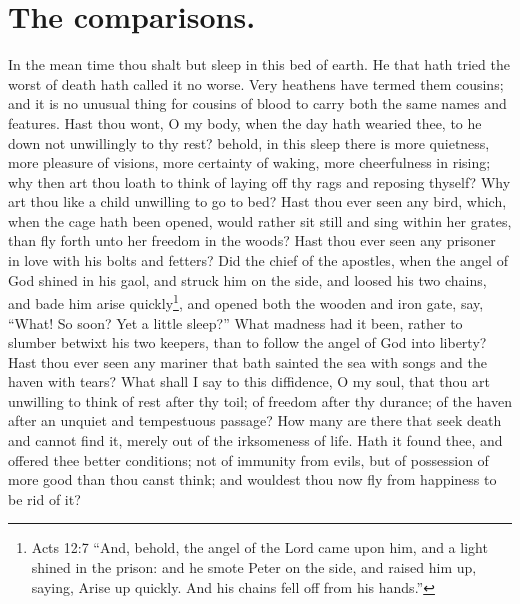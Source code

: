 \section{The comparisons.}
In the mean time thou shalt but sleep in this bed of earth. He that hath tried the worst of death hath called it no worse. Very heathens have termed them cousins; and it is no unusual thing for cousins of blood to carry both the same names and features. Hast thou wont, O my body, when the day hath wearied thee, to he down not unwillingly to thy rest? behold, in this sleep there is more quietness, more pleasure of visions, more certainty of waking, more cheerfulness in rising; why then art thou loath to think of laying off thy rags and reposing thyself? Why art thou like a child unwilling to go to bed? Hast thou ever seen any bird, which, when the cage hath been opened, would rather sit still and sing within her grates, than fly forth unto her freedom in the woods? Hast thou ever seen any prisoner in love with his bolts and fetters? Did the chief of the apostles, when the angel of God shined in his gaol, and struck him on the side, and loosed his two chains, and bade him arise quickly\footnote{Acts 12:7 ``And, behold, the angel of the Lord came upon him, and a light shined in the prison: and he smote Peter on the side, and raised him up, saying, Arise up quickly. And his chains fell off from his hands.''}, and opened both the wooden and iron gate, say, ``What! So soon? Yet a little sleep?'' What madness had it been, rather to slumber betwixt his two keepers, than to follow the angel of God into liberty? Hast thou ever seen any mariner that bath sainted the sea with songs and the haven with tears? What shall I say to this diffidence, O my soul, that thou art unwilling to think of rest after thy toil; of freedom after thy durance; of the haven after an unquiet and tempestuous passage? How many are there that seek death and cannot find it, merely out of the irksomeness of life. Hath it found thee, and offered thee better conditions; not of immunity from evils, but of possession of more good than thou canst think; and wouldest thou now fly from happiness to be rid of it? 

